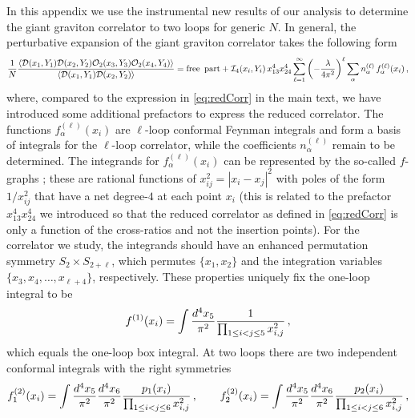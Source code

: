 \documentclass[aps,prl,twocolumn, longbibliography,footinbib,superscriptaddress, preprintnumbers]{revtex4-1}
\newcommand{\<}{\langle}
\renewcommand{\>}{\rangle}
\begin{document}
{In this appendix we use the instrumental new results of our analysis to determine the giant graviton correlator to two loops for generic $N$. In general, the perturbative expansion of the giant graviton correlator takes the following form
\begin{align} \label{eq:twoloop1}
 {1 \over N} \frac{  \langle  \mathcal{D}(x_1, Y_1) \mathcal{D}(x_2, Y_2) \mathcal{O}_2(x_3, Y_3) \mathcal{O}_2(x_4, Y_4) \rangle }{ \langle  \mathcal{D}(x_1, Y_1) \mathcal{D}(x_2, Y_2) \rangle}
 = {\rm free \,\,\, part} +  \mathcal{I}_4(x_i, Y_i) \, x_{13}^4  x_{24}^4 \sum_{\ell=1}^{\infty} \left(- {\lambda \over 4\pi^2} \right)^{\ell} \sum_{\alpha}   n^{(\ell)}_{\alpha}   \, f^{(\ell)}_{\alpha}(x_i)  \, ,
\end{align}
where, compared to the expression in \eqref{eq:redCorr} in the main text, we have introduced some additional prefactors to express the reduced correlator. The functions $f^{(\ell)}_{\alpha}(x_i)$ are $\ell$-loop conformal Feynman integrals and form a basis of integrals for the $\ell$-loop correlator, while the coefficients $n^{(\ell)}_{\alpha}$ remain to be determined.  The integrands for $f^{(\ell)}_{\alpha}(x_i)$ can be represented by the so-called $f$-graphs \cite{Eden:2012tu}; these are rational functions of $x_{ij}^2 = |x_i-x_j|^2$ with poles of the form $1/x_{ij}^2$ that have a net degree-$4$ at each point $x_i$ (this is related to the prefactor $ x_{13}^4  x_{24}^4$ we introduced so that the reduced correlator as defined in \eqref{eq:redCorr} is only a function of the cross-ratios and not the insertion points). For the correlator we study, the integrands should have an enhanced permutation symmetry $S_2 \times S_{2+\ell}$, which permutes $\{ x_1, x_2 \}$ and the integration variables $\{ x_3, x_4, \ldots, x_{\ell+4} \}$, respectively.  These properties uniquely fix the one-loop integral to be
\begin{align} \label{eq:one-loop}
    f^{(1)}(x_i)  =\int \frac{d^4 x_5}{\pi^2}   {  1   \over \prod_{1 \leq i<j \leq 5} x^2_{i,j}}\, ,
     \end{align}
 which equals  the one-loop box  integral. At two loops there are two independent conformal integrals with the right symmetries
     \begin{align} \label{eq:two-loop}
    f^{(2)}_1(x_i)  = \int \frac{d^4 x_5}{\pi^2} \frac{d^4 x_6}{\pi^2}   {  p_1(x_i)   \over \prod_{1 \leq i<j \leq 6} x^2_{i,j}} \,  , \qquad    f^{(2)}_2(x_i)   =  \int \frac{d^4 x_5}{\pi^2} \frac{d^4 x_6}{\pi^2}   {  p_2(x_i)   \over \prod_{1 \leq i<j \leq 6} x^2_{i,j}} \,  ,

\end{align}}
\end{document}
